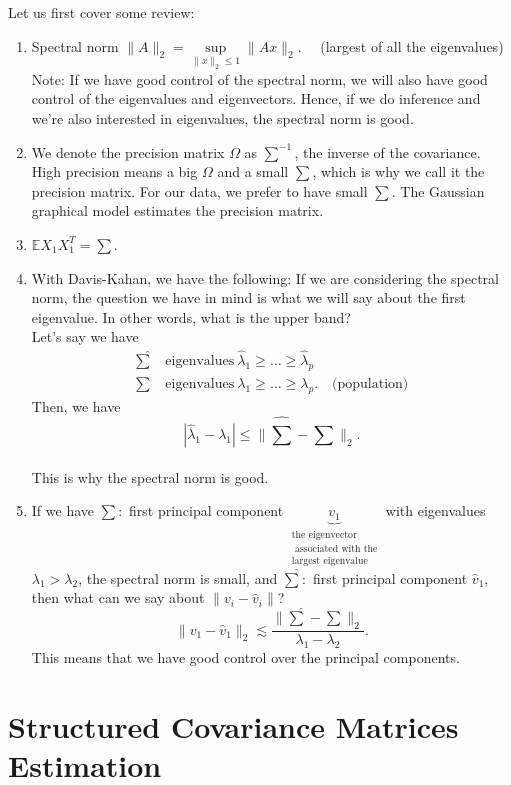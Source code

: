 \documentclass[twoside]{article}
\theoremstyle{definition}
\theoremstyle{definition}
\theoremstyle{remark}
\begin{document}
Let us first cover some review:
\begin{enumerate}
\item Spectral norm $\| A \|_2 = \sup \limits_{\| x \|_2 \leq 1} \| Ax \|_2. \quad$ (largest of all the eigenvalues) \\ Note: If we have good control of the spectral norm, we will also have good control of the eigenvalues and eigenvectors. Hence, if we do inference and we're also interested in eigenvalues, the spectral norm is good.
\item We denote the precision matrix $\Omega$ as $\sum ^{-1}$, the inverse of the covariance. High precision means a big $\Omega$ and a small $\sum$, which is why we call it the precision matrix. For our data, we prefer to have small $\sum$. The Gaussian graphical model estimates the precision matrix.
\item $\mathbb{E} X_1 X_1^T = \sum$.
\item With Davis-Kahan, we have the following: If we are considering the spectral norm, the question we have in mind is what we will say about the first eigenvalue. In other words, what is the upper band? \\
Let's say we have \\
\[
\begin{aligned}
\widehat\sum \ &\text{eigenvalues} \ \widehat\lambda_1 \geq \ldots \geq \widehat\lambda_p \\
\sum \ &\text{eigenvalues} \ \lambda_1 \geq \ldots \geq \lambda_p. \quad \text{(population)}
\end{aligned}
\]
Then, we have
\[
| \widehat\lambda_1 - \lambda_1 | \leq \| \widehat\sum - \sum \|_2.
\] \\
This is why the spectral norm is good.
\item If we have $\sum:$ first principal component $\underbrace{v_1}_{\substack{\text{the eigenvector} \\ \text{ associated with the} \\ \text{largest eigenvalue}}}$ with eigenvalues $\lambda_1 > \lambda_2$, the spectral norm is small, and $\widehat\sum:$ first principal component $\widehat v_1$, then what can we say about $\| v_i - \widehat v_i \|$? \\
\[
\| v_1 - \widehat v_1 \|_2 \lesssim \frac{\| \widehat\sum - \sum \|_2}{\lambda_1 - \lambda_2}.
\]
This means that we have good control over the principal components.
\end{enumerate}

\section{Structured Covariance Matrices Estimation}
\end{document}
